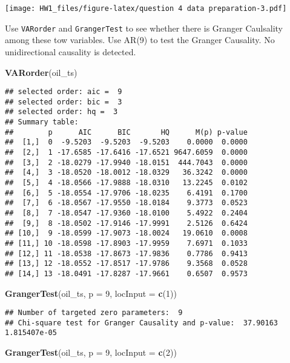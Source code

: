 \documentclass[]{article}
\newenvironment{Shaded}{\begin{snugshade}}{\end{snugshade}}
\newcommand{\KeywordTok}[1]{\textcolor[rgb]{0.13,0.29,0.53}{\textbf{#1}}}
\newcommand{\DataTypeTok}[1]{\textcolor[rgb]{0.13,0.29,0.53}{#1}}
\newcommand{\DecValTok}[1]{\textcolor[rgb]{0.00,0.00,0.81}{#1}}
\newcommand{\NormalTok}[1]{#1}
\begin{document}
\texttt{[image: HW1\_files/figure-latex/question 4 data preparation-3.pdf]}

Use \texttt{VARorder} and \texttt{GrangerTest} to see whether there is
Granger Caulsality among these tow variables. Use AR(9) to test the
Granger Causality. No unidirectional causality is detected.

\begin{Shaded}
\begin{Highlighting}[]
\KeywordTok{VARorder}\NormalTok{(oil_ts)}
\end{Highlighting}
\end{Shaded}

\begin{verbatim}
## selected order: aic =  9 
## selected order: bic =  3 
## selected order: hq =  3 
## Summary table:  
##        p      AIC      BIC       HQ      M(p) p-value
##  [1,]  0  -9.5203  -9.5203  -9.5203    0.0000  0.0000
##  [2,]  1 -17.6585 -17.6416 -17.6521 9647.6059  0.0000
##  [3,]  2 -18.0279 -17.9940 -18.0151  444.7043  0.0000
##  [4,]  3 -18.0520 -18.0012 -18.0329   36.3242  0.0000
##  [5,]  4 -18.0566 -17.9888 -18.0310   13.2245  0.0102
##  [6,]  5 -18.0554 -17.9706 -18.0235    6.4191  0.1700
##  [7,]  6 -18.0567 -17.9550 -18.0184    9.3773  0.0523
##  [8,]  7 -18.0547 -17.9360 -18.0100    5.4922  0.2404
##  [9,]  8 -18.0502 -17.9146 -17.9991    2.5126  0.6424
## [10,]  9 -18.0599 -17.9073 -18.0024   19.0610  0.0008
## [11,] 10 -18.0598 -17.8903 -17.9959    7.6971  0.1033
## [12,] 11 -18.0538 -17.8673 -17.9836    0.7786  0.9413
## [13,] 12 -18.0552 -17.8517 -17.9786    9.3568  0.0528
## [14,] 13 -18.0491 -17.8287 -17.9661    0.6507  0.9573
\end{verbatim}

\begin{Shaded}
\begin{Highlighting}[]
\KeywordTok{GrangerTest}\NormalTok{(oil_ts, }\DataTypeTok{p =} \DecValTok{9}\NormalTok{, }\DataTypeTok{locInput =} \KeywordTok{c}\NormalTok{(}\DecValTok{1}\NormalTok{))}
\end{Highlighting}
\end{Shaded}

\begin{verbatim}
## Number of targeted zero parameters:  9 
## Chi-square test for Granger Causality and p-value:  37.90163 1.815407e-05
\end{verbatim}

\begin{Shaded}
\begin{Highlighting}[]
\KeywordTok{GrangerTest}\NormalTok{(oil_ts, }\DataTypeTok{p =} \DecValTok{9}\NormalTok{, }\DataTypeTok{locInput =} \KeywordTok{c}\NormalTok{(}\DecValTok{2}\NormalTok{))}
\end{Highlighting}
\end{Shaded}
\end{document}
